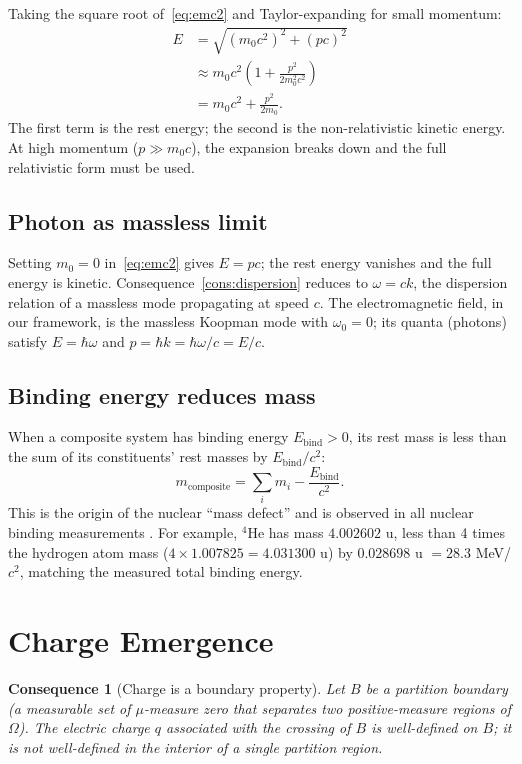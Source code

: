 \documentclass[11pt,twocolumn,a4paper]{article}
\theoremstyle{axiomstyle}
\theoremstyle{conseqstyle}
\newtheorem{consequence}{Consequence}
\theoremstyle{definition}
\theoremstyle{remark}
\begin{document}
Taking the square root of~\eqref{eq:emc2} and Taylor-expanding for small momentum:
\begin{align*}
E &= \sqrt{(m_{0}c^{2})^{2}+(pc)^{2}}\\
  &\approx m_{0}c^{2}\left(1+\frac{p^{2}}{2m_{0}^{2}c^{2}}\right)\\
  &= m_{0}c^{2}+\frac{p^{2}}{2m_{0}}.
\end{align*}
The first term is the rest energy; the second is the non-relativistic kinetic energy. At high momentum ($p\gg m_{0}c$), the expansion breaks down and the full relativistic form must be used.

\subsection{Photon as massless limit}

Setting $m_{0}=0$ in~\eqref{eq:emc2} gives $E=pc$; the rest energy vanishes and the full energy is kinetic. Consequence~\ref{cons:dispersion} reduces to $\omega=ck$, the dispersion relation of a massless mode propagating at speed $c$. The electromagnetic field, in our framework, is the massless Koopman mode with $\omega_{0}=0$; its quanta (photons) satisfy $E=\hbar\omega$ and $p=\hbar k=\hbar\omega/c=E/c$.

\subsection{Binding energy reduces mass}

When a composite system has binding energy $E_{\text{bind}}>0$, its rest mass is less than the sum of its constituents' rest masses by $E_{\text{bind}}/c^{2}$:
\begin{equation*}
m_{\text{composite}}=\sum_{i}m_{i}-\frac{E_{\text{bind}}}{c^{2}}.
\end{equation*}
This is the origin of the nuclear ``mass defect'' and is observed in all nuclear binding measurements \citep{audi2017}. For example, $^{4}$He has mass $4.002602$ u, less than 4 times the hydrogen atom mass ($4\times 1.007825=4.031300$ u) by $0.028698$ u $=28.3$ MeV/$c^{2}$, matching the measured total binding energy.

\section{Charge Emergence}
\label{sec:chargeemergence}

\begin{consequence}[Charge is a boundary property]
\label{cons:chargeemergence}
Let $B$ be a partition boundary (a measurable set of $\mu$-measure zero that separates two positive-measure regions of $\Omega$). The electric charge $q$ associated with the crossing of $B$ is well-defined on $B$; it is not well-defined in the interior of a single partition region.
\end{consequence}
\end{document}
